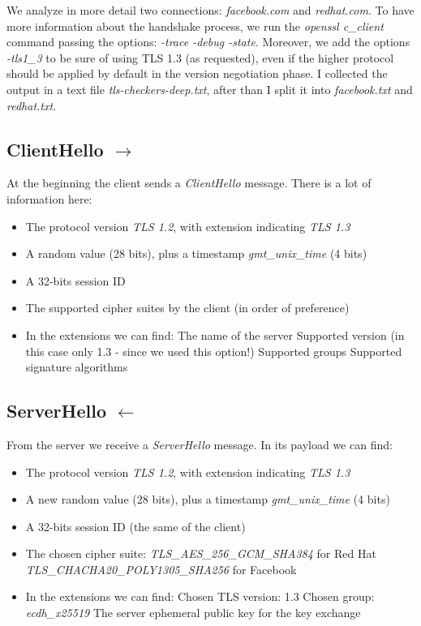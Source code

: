 \documentclass{article}
\begin{document}
We analyze in more detail two connections: \emph{facebook.com} and \emph{redhat.com}.
To have more information about the handshake process, we run the \emph{openssl c\_client}
command passing the options: \emph{-trace -debug -state}.
Moreover, we add the options \emph{-tls1\_3}
to be sure of using TLS 1.3 (as requested), even if the higher protocol should be
applied by default in the version negotiation phase.
I collected the output in a text file \emph{tls-checkers-deep.txt},
after than I split it into \emph{facebook.txt} and \emph{redhat.txt}.

\subsection{ClientHello $\rightarrow$}

At the beginning the client sends a \emph{ClientHello} message.
There is a lot of information here:

 \begin{itemize}
 	\item The protocol version \emph{TLS 1.2}, with extension indicating \emph{TLS 1.3}
	\item A random value (28 bits), plus a timestamp \emph{gmt\_unix\_time} (4 bits)
	\item A 32-bits session ID
	\item The supported cipher suites by the client (in order of preference)
	\item In the extensions we can find:
		\subitem The name of the server
		\subitem Supported version (in this case only 1.3 - since we used this option!)
		\subitem Supported groups
		\subitem Supported signature algorithms
\end{itemize}

\subsection{ServerHello $\leftarrow$}

From the server we receive a \emph{ServerHello} message.
In its payload we can find:

 \begin{itemize}
 	\item The protocol version \emph{TLS 1.2}, with extension indicating \emph{TLS 1.3}
	\item A new random value (28 bits), plus a timestamp \emph{gmt\_unix\_time} (4 bits)
	\item A 32-bits session ID (the same of the client)
	\item The chosen cipher suite: 
		\subitem \emph{TLS\_AES\_256\_GCM\_SHA384} for Red Hat
		\subitem \emph{TLS\_CHACHA20\_POLY1305\_SHA256} for Facebook
	\item In the extensions we can find:
		\subitem Chosen TLS version:  1.3
		\subitem Chosen group: \emph{ecdh\_x25519}
		\subitem The server ephemeral public key for the key exchange
\end{itemize}
\end{document}
